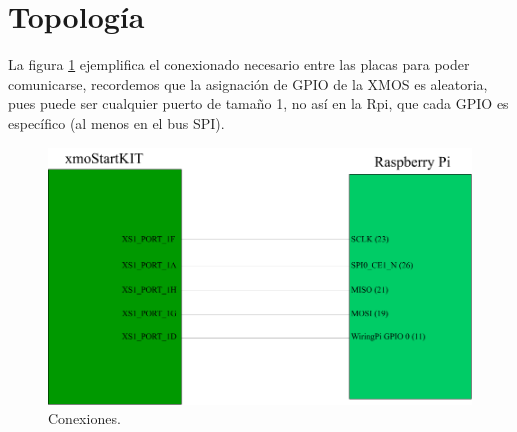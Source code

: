 \documentclass{article}
\begin{document}
\section{Topología}
La figura \ref{fig:top} ejemplifica el conexionado necesario entre las placas para poder comunicarse, recordemos que la asignación de GPIO de la XMOS es aleatoria, pues puede ser cualquier puerto de tamaño 1, no así en la Rpi, que cada GPIO es específico (al menos en el bus SPI).%
\begin{figure}[ht!]\centering
\includegraphics[scale=0.34]{./top.png}
\caption{Conexiones.}
\label{fig:top}
\end{figure}\newpage
\end{document}
